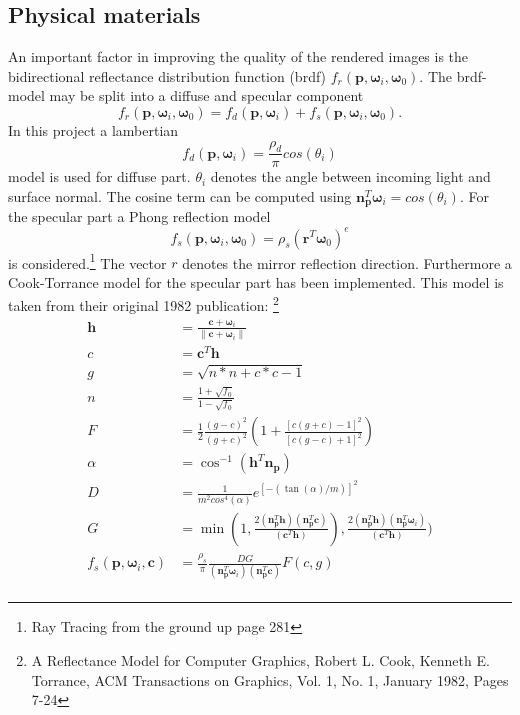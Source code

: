 \subsection{Physical materials}
An important factor in improving the quality of the rendered images is the bidirectional reflectance distribution function (brdf) $f_r(\mathbf{p},\mathbf{\omega}_i,\mathbf{\omega}_0)$. The brdf-model may be split into a diffuse and specular component
\begin{equation}
f_r(\mathbf{p},\mathbf{\omega}_i,\mathbf{\omega}_0) = f_d(\mathbf{p},\mathbf{\omega}_i) + f_s(\mathbf{p},\mathbf{\omega}_i,\mathbf{\omega}_0).
\end{equation}
In this project a lambertian
\begin{equation}
f_d(\mathbf{p},\mathbf{\omega}_i) = \frac{\rho_d}{\pi} cos(\theta_i)
\end{equation}
model is used for diffuse part. $\theta_i$ denotes the angle between incoming light and surface normal. The cosine term can be computed using $\mathbf{n}_{\mathbf{p}}^T \mathbf{\omega}_i = cos(\theta_i)$.  
For the specular part a Phong reflection model 
\begin{equation}
f_s(\mathbf{p},\mathbf{\omega}_i,\mathbf{\omega}_0) = \rho_s (\mathbf{r}^T \mathbf{\omega}_0)^e
\end{equation}
is considered.\footnote{Ray Tracing from the ground up page 281} The vector $r$ denotes the mirror reflection direction.  Furthermore a Cook-Torrance model for the specular part has been implemented. This model is taken from their original 1982 publication: \footnote{A Reflectance Model for Computer Graphics, Robert L. Cook, Kenneth E. Torrance, ACM Transactions on Graphics, Vol. 1, No. 1, January 1982, Pages 7-24}
\begin{align}
\mathbf{h} &= \frac{\mathbf{c} + \mathbf{\omega}_i}{\| \mathbf{c} + \mathbf{\omega}_i \|} \\
c & = \mathbf{c}^T \mathbf{h} \\
g &=  \sqrt{n*n + c*c - 1} \\
n &= \frac{1 + \sqrt{f_0}}{1 - \sqrt{f_0}} \\
F &= \frac{1}{2} \frac{(g - c)^2}{(g + c)^2} (1 + \frac{[c (g + c) - 1]^2}{[c (g - c) + 1]^2}) \\
\alpha &= \cos^{-1}(\mathbf{h}^T \mathbf{n}_\mathbf{p}) \\
D &= \frac{1}{m^2 cos^4(\alpha)}e^{[-(\tan(\alpha)/m)]^2} \\
G &= \min(1,
     \frac{2 (\mathbf{n}_\mathbf{p}^T \mathbf{h})(\mathbf{n}_\mathbf{p}^T \mathbf{c})  }{(\mathbf{c}^T \mathbf{h})}),
     \frac{2 (\mathbf{n}_\mathbf{p}^T \mathbf{h})(\mathbf{n}_\mathbf{p}^T \mathbf{\omega}_i)  }{(\mathbf{c}^T \mathbf{h})}) \\
f_s(\mathbf{p},\mathbf{\omega}_i,\mathbf{c}) &= \frac{\rho_s}{\pi}
 \frac{DG}{(\mathbf{n}_{\mathbf{p}}^T \mathbf{\omega}_i)(\mathbf{n}_{\mathbf{p}}^T \mathbf{c})} F(c,g) \\
\end{align} 

